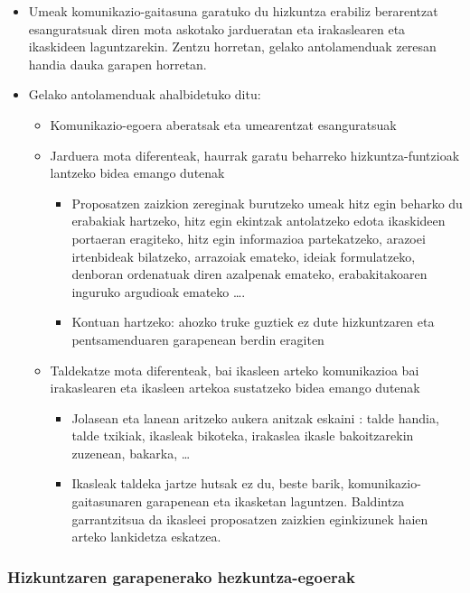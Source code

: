 \documentclass[
]{book}
\providecommand{\tightlist}{%
  \setlength{\itemsep}{0pt}\setlength{\parskip}{0pt}}
\begin{document}
\begin{itemize}
\tightlist
\item
  Umeak komunikazio-gaitasuna garatuko du hizkuntza erabiliz berarentzat esanguratsuak diren mota askotako jardueratan eta irakaslearen eta ikaskideen laguntzarekin. Zentzu horretan, gelako antolamenduak zeresan handia dauka garapen horretan.
\item
  Gelako antolamenduak ahalbidetuko ditu:

  \begin{itemize}
  \tightlist
  \item
    Komunikazio-egoera aberatsak eta umearentzat esanguratsuak
  \item
    Jarduera mota diferenteak, haurrak garatu beharreko hizkuntza-funtzioak lantzeko bidea emango dutenak

    \begin{itemize}
    \tightlist
    \item
      Proposatzen zaizkion zereginak burutzeko umeak hitz egin beharko du erabakiak hartzeko, hitz egin ekintzak antolatzeko edota ikaskideen portaeran eragiteko, hitz egin informazioa partekatzeko, arazoei irtenbideak bilatzeko, arrazoiak emateko, ideiak formulatzeko, denboran ordenatuak diren azalpenak emateko, erabakitakoaren inguruko argudioak emateko \ldots.
    \item
      Kontuan hartzeko: ahozko truke guztiek ez dute hizkuntzaren eta pentsamenduaren garapenean berdin eragiten
    \end{itemize}
  \item
    Taldekatze mota diferenteak, bai ikasleen arteko komunikazioa bai irakaslearen eta ikasleen artekoa sustatzeko bidea emango dutenak

    \begin{itemize}
    \tightlist
    \item
      Jolasean eta lanean aritzeko aukera anitzak eskaini : talde handia, talde txikiak, ikasleak bikoteka, irakaslea ikasle bakoitzarekin zuzenean, bakarka, \ldots{}
    \item
      Ikasleak taldeka jartze hutsak ez du, beste barik, komunikazio-gaitasunaren garapenean eta ikasketan laguntzen. Baldintza garrantzitsua da ikasleei proposatzen zaizkien eginkizunek haien arteko lankidetza eskatzea.
    \end{itemize}
  \end{itemize}
\end{itemize}

\hypertarget{hizkuntzaren-garapenerako-hezkuntza-egoerak}{%
\subsubsection{Hizkuntzaren garapenerako hezkuntza-egoerak}\label{hizkuntzaren-garapenerako-hezkuntza-egoerak}}
\end{document}
